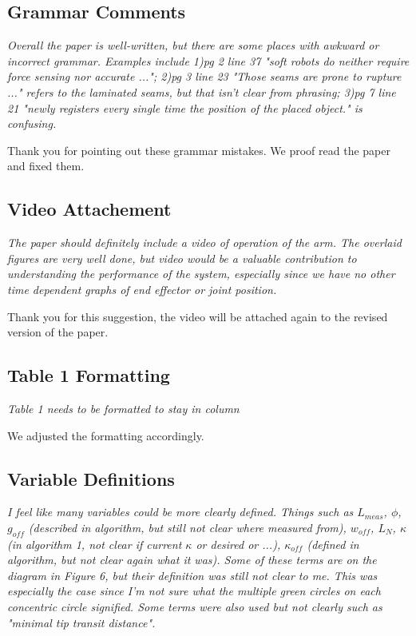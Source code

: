 \documentclass[letterpaper, 10 pt, twocolumn, conference]{article}
\begin{document}
\subsection{Grammar Comments}
\textit{Overall the paper is well-written, but there are some places with awkward or incorrect grammar. 
Examples include 
1)pg 2 line 37 "soft robots do neither require force sensing nor accurate ..."; 
2)pg 3 line 23 "Those seams are prone to rupture ..." refers to the laminated seams, but that isn't clear from phrasing; 
3)pg 7 line 21 "newly registers every single time the position of the placed object." is confusing.}

Thank you for pointing out these grammar mistakes. We proof read the paper and fixed them. 

\subsection{Video Attachement}
\textit{The paper should definitely include a video of operation of the arm. The overlaid figures are very well done, but video would be a valuable contribution to understanding the performance of the system, especially since we have no other time dependent graphs of end effector or joint position.}

Thank you for this suggestion, the video will be attached again to the revised version of the paper.

\subsection{Table 1 Formatting}
\textit{Table 1 needs to be formatted to stay in column}

We adjusted the formatting accordingly.

\subsection{Variable Definitions}
\textit{I feel like many variables could be more clearly defined. Things such as $L_{meas}$, $\phi$, $g_{off}$ (described in algorithm, but still not clear where measured from), $w_{off}$, $L_N$, $\kappa$ (in algorithm 1, not clear if current $\kappa$ or desired or ...), $\kappa_{off}$ (defined in algorithm, but not clear again what it was). Some of these terms are on the diagram in Figure 6, but their definition was still not clear to me. This was especially the case since I'm not sure what the multiple green circles on each concentric circle signified. Some terms were also used but not clearly such as "minimal tip transit distance".}
\end{document}
